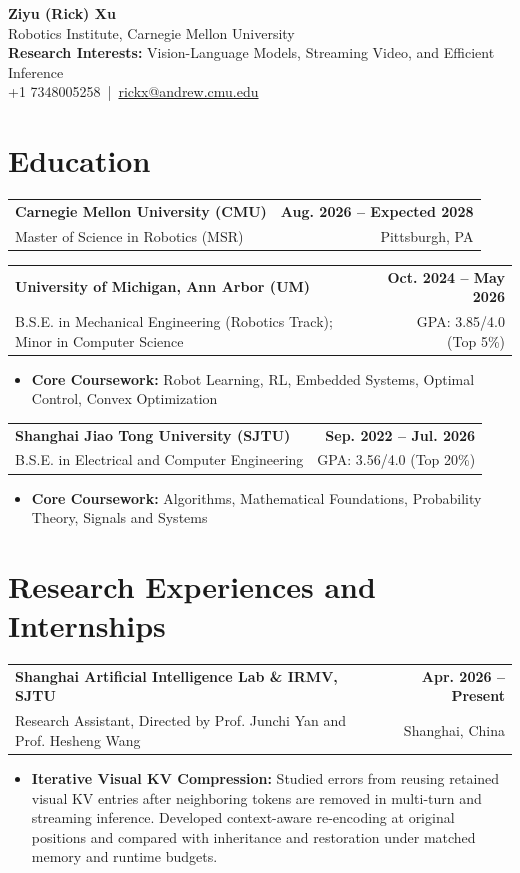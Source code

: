 \documentclass[11pt,letterpaper]{article}
\makeatletter
\newcommand{\resumeSubheading}[4]{
    \begin{tabularx}{\textwidth}{@{}Xr@{}}
        \textbf{#1} & \textbf{#2} \\
        #3 & #4 \\
    \end{tabularx}
}
\newcommand{\resumeItem}[1]{
    \item #1
}
\makeatother
\begin{document}
\begin{center}
    {\LARGE \textbf{Ziyu (Rick) Xu}} \\[2pt]
    {\small Robotics Institute, Carnegie Mellon University} \\[1pt]
    {\small \textbf{Research Interests:} Vision-Language Models, Streaming Video, and Efficient Inference} \\[1pt]
    {\small
    +1 7348005258
    \,|\, 
    \href{mailto:rickx@andrew.cmu.edu}{rickx@andrew.cmu.edu}
    } \\[1pt]
\end{center}

\section*{Education}
\resumeSubheading
{Carnegie Mellon University (CMU)}
{Aug. 2026 -- Expected 2028}
{\hspace*{1.4em}Master of Science in Robotics (MSR)}
{Pittsburgh, PA}
\resumeSubheading
{University of Michigan, Ann Arbor (UM)}
{Oct. 2024 -- May 2026}
{\hspace*{1.4em}B.S.E. in Mechanical Engineering (Robotics Track); Minor in Computer Science}
{GPA: 3.85/4.0 (Top 5\%)}
\begin{itemize}[leftmargin=2.4em, itemsep=0.5pt, topsep=0pt]
    \item \textbf{Core Coursework:} Robot Learning, RL, Embedded Systems, Optimal Control, Convex Optimization
\end{itemize}

\resumeSubheading
{Shanghai Jiao Tong University (SJTU)}
{Sep. 2022 -- Jul. 2026}
{\hspace*{1.4em}B.S.E. in Electrical and Computer Engineering}
{GPA: 3.56/4.0 (Top 20\%)}
\begin{itemize}[leftmargin=2.4em, itemsep=0.5pt, topsep=0pt]
    \item \textbf{Core Coursework:} Algorithms, Mathematical Foundations, Probability Theory, Signals and Systems
\end{itemize}
\section*{Research Experiences and Internships}
\resumeSubheading
{Shanghai Artificial Intelligence Lab \& IRMV, SJTU }
{Apr. 2026 -- Present}
{\hspace*{1.4em}Research Assistant, Directed by Prof. Junchi Yan and Prof. Hesheng Wang}
{Shanghai, China}
\begin{itemize}[leftmargin=2.4em, itemsep=0.5pt, topsep=0pt]
\small
\resumeItem{\textbf{Iterative Visual KV Compression:} Studied errors from reusing retained visual KV entries after neighboring tokens are removed in multi-turn and streaming inference. Developed context-aware re-encoding at original positions and compared with inheritance and restoration under matched memory and runtime budgets.}
\end{itemize}
\end{document}
